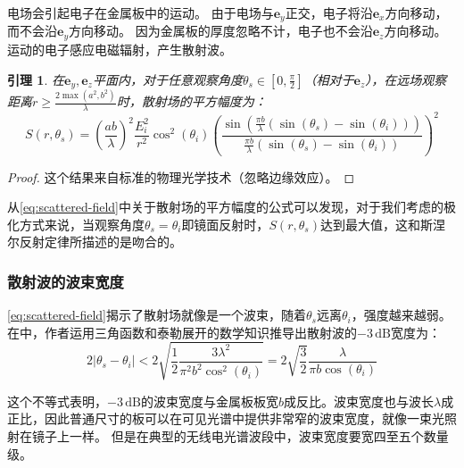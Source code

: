\documentclass[supercite]{HustGraduPaper}
\newtheorem{lemma}{\indent 引理}[section]
\begin{document}
电场会引起电子在金属板中的运动。
由于电场与$\boldsymbol{e}_{y}$正交，电子将沿$\boldsymbol{e}_{x}$方向移动，而不会沿$\boldsymbol{e}_{y}$方向移动。
因为金属板的厚度忽略不计，电子也不会沿$\boldsymbol{e}_{z}$方向移动。
运动的电子感应电磁辐射，产生散射波。

\begin{lemma}
	\label{lemma:scattered-field}
	在$\boldsymbol{e}_{y}, \boldsymbol{e}_{z}$平面内，对于任意观察角度$\theta_{s} \in\left[0, \frac{\pi}{2}\right]$（相对于$\boldsymbol{e}_{z}$），在远场观察距离$r \geq \frac{2 \max \left(a^{2}, b^{2}\right)}{\lambda}$时，散射场的平方幅度为：
	\begin{equation}
		S\left(r, \theta_{s}\right)=\left(\frac{a b}{\lambda}\right)^{2} \frac{E_{i}^{2}}{r^{2}} \cos ^{2}\left(\theta_{i}\right)\left(\frac{\sin \left(\frac{\pi b}{\lambda}\left(\sin \left(\theta_{s}\right)-\sin \left(\theta_{i}\right)\right)\right)}{\frac{\pi b}{\lambda}\left(\sin \left(\theta_{s}\right)-\sin \left(\theta_{i}\right)\right)}\right)^{2}
		\label{eq:scattered-field}
	\end{equation}
\end{lemma}

\begin{proof}
	这个结果来自标准的物理光学技术（忽略边缘效应）\cite{balanis2012advanced}。
\end{proof}

从\autoref{eq:scattered-field}中关于散射场的平方幅度的公式可以发现，对于我们考虑的极化方式来说，当观察角度$\theta_{s}=\theta_{i}$即镜面反射时，$S\left(r, \theta_{s}\right)$达到最大值，这和斯涅尔反射定律所描述的是吻合的。

\subsubsection{散射波的波束宽度}

\autoref{eq:scattered-field}揭示了散射场就像是一个波束，随着$\theta_{s}$远离$\theta_{i}$，强度越来越弱。在中，作者运用三角函数和泰勒展开的数学知识推导出散射波的$-3\,\mathrm{dB}$宽度为：
\begin{equation}
	2\left|\theta_{s}-\theta_{i}\right|<2\sqrt{\frac{1}{2} \frac{3 \lambda^{2}}{\pi^{2} b^{2} \cos ^{2}\left(\theta_{i}\right)}}=2\sqrt{\frac{3}{2}} \frac{\lambda}{\pi b \cos \left(\theta_{i}\right)}
\end{equation}

这个不等式表明，$-3\,\mathrm{dB}$的波束宽度与金属板板宽$b$成反比。波束宽度也与波长$\lambda$成正比，因此普通尺寸的板可以在可见光谱中提供非常窄的波束宽度，就像一束光照射在镜子上一样。
但是在典型的无线电光谱波段中，波束宽度要宽四至五个数量级。
\end{document}
